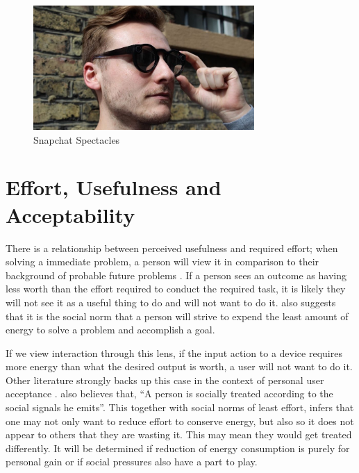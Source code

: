 \documentclass{l4proj}
\begin{document}
\begin{figure}[!htb]
    \centering
    \includegraphics[width=0.75\textwidth]{images/spectacles.jpg}
        \caption{Snapchat Spectacles}
        \label{fig:Spectacles}
\end{figure}

\section{Effort, Usefulness and Acceptability}

There is a relationship between perceived usefulness and required effort; when solving a immediate problem, a person will view it in comparison to their background of probable future problems \citep{zipf_human_2016}.  If a person sees an outcome as having less worth than the effort required to conduct the required task, it is likely they will not see it as a useful thing to do and will not want to do it. \citet{zipf_human_2016} also suggests that it is the social norm that a person will strive to expend the least amount of energy to solve a problem and accomplish a goal.

If we view interaction through this lens, if the input action to a device requires more energy than what the desired output is worth, a user will not want to do it. Other literature strongly backs up this case in the context of personal user acceptance \citep{davis_perceived_1989}. \citet{zipf_human_2016} also believes that, ``A person is socially treated according to the social signals he emits''. This together with social norms of least effort, infers that one may not only want to reduce effort to conserve energy, but also so it does not appear to others that they are wasting it. This may mean they would get treated differently. It will be determined if reduction of energy consumption is purely for personal gain or if social pressures also have a part to play. 
\end{document}
